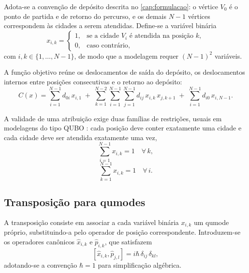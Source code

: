     Adota-se a convenção de depósito descrita no \autoref{cap:formulacao}: o vértice $V_0$ é o ponto de partida e de retorno do percurso, e os demais $N-1$ vértices correspondem às cidades a serem atendidas. Define-se a variável binária
    \begin{equation}\label{eq:form_qubo_var}
        x_{i,k} =
        \begin{cases}
            1, & \text{se a cidade } V_i \text{ é atendida na posição } k,\\
            0, & \text{caso contrário},
        \end{cases}
    \end{equation}
    \noindent com $i, k \in \{1, \dots, N-1\}$, de modo que a modelagem requer $(N-1)^2$ variáveis.

    A função objetivo reúne os deslocamentos de saída do depósito, os deslocamentos internos entre posições consecutivas e o retorno ao depósito:
    \begin{equation}\label{eq:form_qubo_obj}
        C(x) = \sum_{i=1}^{N-1} d_{0i}\, x_{i,1}
        \;+\; \sum_{k=1}^{N-2} \sum_{i=1}^{N-1} \sum_{j=1}^{N-1} d_{ij}\, x_{i,k}\, x_{j,k+1}
        \;+\; \sum_{i=1}^{N-1} d_{i0}\, x_{i,N-1} .
    \end{equation}

    A validade de uma atribuição exige duas famílias de restrições, usuais em modelagens do tipo QUBO \cite{lucas2014ising}: cada posição deve conter exatamente uma cidade e cada cidade deve ser atendida exatamente uma vez,
    \begin{equation}\label{eq:form_qubo_restr_one_pos_per_city}
        \sum_{i=1}^{N-1} x_{i,k} = 1 \quad \forall\, k ,
    \end{equation}
    \begin{equation}\label{eq:form_qubo_restr_one_city_per_pos}
        \sum_{k=1}^{N-1} x_{i,k} = 1 \quad \forall\, i .
    \end{equation}

    \subsection{Transposição para qumodes}\label{subsec:form_qubo_transposicao}

        A transposição consiste em associar a cada variável binária $x_{i,k}$ um qumode próprio, substituindo-a pelo operador de posição correspondente. Introduzem-se os operadores canônicos $\hat{x}_{i,k}$ e $\hat{p}_{i,k}$, que satisfazem \cite{weedbrook2012gaussian, verdon2019quantum}
        \begin{equation}\label{eq:form_qubo_comut}
            [\hat{x}_{i,k}, \hat{p}_{j,l}] = i\hbar\, \delta_{ij}\, \delta_{kl} ,
        \end{equation}
        \noindent adotando-se a convenção $\hbar = 1$ para simplificação algébrica.


